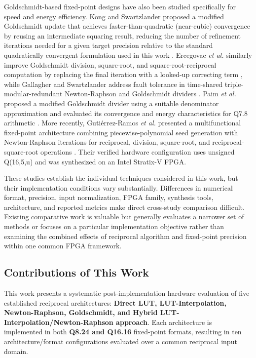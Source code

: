 \documentclass[manuscript,screen,review]{acmart}
\begin{document}
Goldschmidt-based fixed-point designs have also been studied specifically for speed and energy efficiency. Kong and Swartzlander proposed a modified Goldschmidt update that achieves faster-than-quadratic (near-cubic) convergence by reusing an intermediate squaring result, reducing the number of refinement iterations needed for a given target precision relative to the standard quadratically convergent formulation used in this work \cite{KongSwartzlander11}. Ercegovac \textit{et al.} similarly improve Goldschmidt division, square-root, and square-root-reciprocal computation by replacing the final iteration with a looked-up correcting term \cite{ErcegovacImbertMatulaMullerWei00}, while Gallagher and Swartzlander address fault tolerance in time-shared triple-modular-redundant Newton-Raphson and Goldschmidt dividers \cite{GallagherSwartzlander00}. Paim \textit{et al.} proposed a modified Goldschmidt divider using a suitable denominator approximation and evaluated its convergence and energy characteristics for Q7.8 arithmetic \cite{Paim17}. More recently, Guti\'{e}rrez-Ramos \textit{et al.} presented a multifunctional fixed-point architecture combining piecewise-polynomial seed generation with Newton-Raphson iterations for reciprocal, division, square-root, and reciprocal-square-root operations \cite{Gutierrez26}. Their verified hardware configuration uses unsigned Q(16,5,u) and was synthesized on an Intel Stratix-V FPGA.

These studies establish the individual techniques considered in this work, but their implementation conditions vary substantially. Differences in numerical format, precision, input normalization, FPGA family, synthesis tools, architecture, and reported metrics make direct cross-study comparison difficult. Existing comparative work is valuable but generally evaluates a narrower set of methods or focuses on a particular implementation objective rather than examining the combined effects of reciprocal algorithm and fixed-point precision within one common FPGA framework.

\subsection{Contributions of This Work}

This work presents a systematic post-implementation hardware evaluation of five established reciprocal architectures: \textbf{Direct LUT, LUT-Interpolation, Newton-Raphson, Goldschmidt, and Hybrid LUT-Interpolation/Newton-Raphson approach}. Each architecture is implemented in both \textbf{Q8.24 and Q16.16} fixed-point formats, resulting in ten architecture/format configurations evaluated over a common reciprocal input domain.
\end{document}
